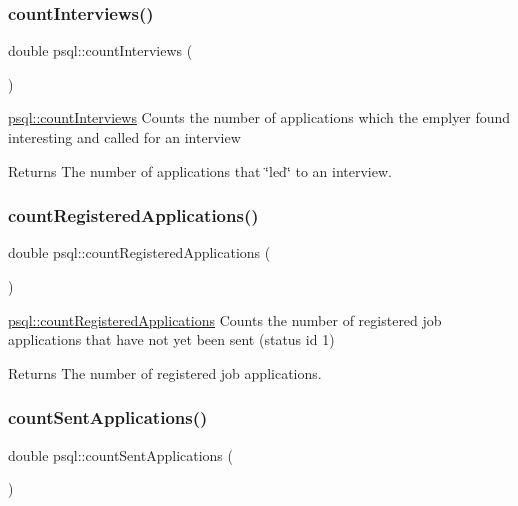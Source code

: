 \subsubsection{\texorpdfstring{count\+Interviews()}{countInterviews()}}
{\footnotesize\ttfamily double psql\+::count\+Interviews (\begin{DoxyParamCaption}{ }\end{DoxyParamCaption})}



\hyperlink{classpsql_a84c1fdea2d09783a39677c4f79d924fc}{psql\+::count\+Interviews} Counts the number of applications which the emplyer found interesting and called for an interview 

\begin{DoxyReturn}{Returns}
The number of applications that \char`\"{}led\char`\"{} to an interview. 
\end{DoxyReturn}
\mbox{\label{classpsql_a8673a80968d293cd3ead6e6e9da8dd8a}} 
\subsubsection{\texorpdfstring{count\+Registered\+Applications()}{countRegisteredApplications()}}
{\footnotesize\ttfamily double psql\+::count\+Registered\+Applications (\begin{DoxyParamCaption}{ }\end{DoxyParamCaption})}



\hyperlink{classpsql_a8673a80968d293cd3ead6e6e9da8dd8a}{psql\+::count\+Registered\+Applications} Counts the number of registered job applications that have not yet been sent (status id 1) 

\begin{DoxyReturn}{Returns}
The number of registered job applications. 
\end{DoxyReturn}
\mbox{\label{classpsql_af5e6768f6c51ac7b94571505f7a628e4}} 
\subsubsection{\texorpdfstring{count\+Sent\+Applications()}{countSentApplications()}}
{\footnotesize\ttfamily double psql\+::count\+Sent\+Applications (\begin{DoxyParamCaption}{ }\end{DoxyParamCaption})}



